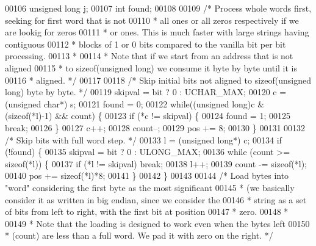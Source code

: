 \begin{DoxyCode}
00106     \textcolor{keywordtype}{unsigned} \textcolor{keywordtype}{long} j;
00107     \textcolor{keywordtype}{int} found;
00108 
00109     \textcolor{comment}{/* Process whole words first, seeking for first word that is not}
00110 \textcolor{comment}{     * all ones or all zeros respectively if we are lookig for zeros}
00111 \textcolor{comment}{     * or ones. This is much faster with large strings having contiguous}
00112 \textcolor{comment}{     * blocks of 1 or 0 bits compared to the vanilla bit per bit processing.}
00113 \textcolor{comment}{     *}
00114 \textcolor{comment}{     * Note that if we start from an address that is not aligned}
00115 \textcolor{comment}{     * to sizeof(unsigned long) we consume it byte by byte until it is}
00116 \textcolor{comment}{     * aligned. */}
00117 
00118     \textcolor{comment}{/* Skip initial bits not aligned to sizeof(unsigned long) byte by byte. */}
00119     skipval = bit ? 0 : UCHAR\_MAX;
00120     c = (\textcolor{keywordtype}{unsigned} \textcolor{keywordtype}{char}*) s;
00121     found = 0;
00122     \textcolor{keywordflow}{while}((\textcolor{keywordtype}{unsigned} \textcolor{keywordtype}{long})c & (\textcolor{keyword}{sizeof}(*l)-1) && count) \{
00123         \textcolor{keywordflow}{if} (*c != skipval) \{
00124             found = 1;
00125             \textcolor{keywordflow}{break};
00126         \}
00127         c++;
00128         count--;
00129         pos += 8;
00130     \}
00131 
00132     \textcolor{comment}{/* Skip bits with full word step. */}
00133     l = (\textcolor{keywordtype}{unsigned} \textcolor{keywordtype}{long}*) c;
00134     \textcolor{keywordflow}{if} (!found) \{
00135         skipval = bit ? 0 : ULONG\_MAX;
00136         \textcolor{keywordflow}{while} (count >= \textcolor{keyword}{sizeof}(*l)) \{
00137             \textcolor{keywordflow}{if} (*l != skipval) \textcolor{keywordflow}{break};
00138             l++;
00139             count -= \textcolor{keyword}{sizeof}(*l);
00140             pos += \textcolor{keyword}{sizeof}(*l)*8;
00141         \}
00142     \}
00143 
00144     \textcolor{comment}{/* Load bytes into "word" considering the first byte as the most significant}
00145 \textcolor{comment}{     * (we basically consider it as written in big endian, since we consider the}
00146 \textcolor{comment}{     * string as a set of bits from left to right, with the first bit at position}
00147 \textcolor{comment}{     * zero.}
00148 \textcolor{comment}{     *}
00149 \textcolor{comment}{     * Note that the loading is designed to work even when the bytes left}
00150 \textcolor{comment}{     * (count) are less than a full word. We pad it with zero on the right. */}

\end{DoxyCode}

